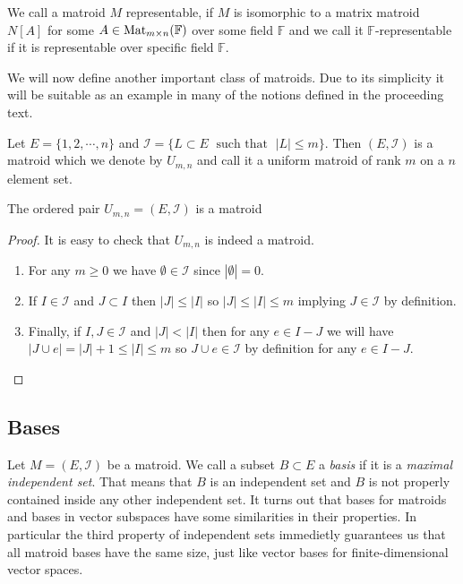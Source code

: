 \begin{defn}
    We call a matroid $M$ representable, if $M$ is isomorphic to a matrix matroid $N[A]$ for some $A \in \text{Mat}_{m \times n}(\mathbb{F})$ over some field $\mathbb{F}$ and we call it $\mathbb{F}$-representable if it is representable over specific field $\mathbb{F}$.
\end{defn}

We will now define another important class of matroids. Due to its simplicity it will be suitable as an example in many of the notions defined in the proceeding text.

\begin{defn}
    Let $E = \{1, 2, \cdots, n\}$ and $\mathcal{I} = \{ L \subset E \; \text{ such that } \; |L| \leq m\}$. Then $(E, \mathcal{I})$ is a matroid which we denote by $U_{m,n}$ and call it a uniform matroid of rank $m$ on a $n$ element set.
\end{defn}
\begin{theorem}
    The ordered pair $U_{m,n} = (E, \mathcal{I})$ is a matroid
    
\end{theorem}

\begin{proof}
    
It is easy to check that $U_{m,n}$ is indeed a matroid. 


\begin{enumerate}
   

\item For any $m \geq 0$ we have $\emptyset \in \mathcal{I}$ since $|\emptyset | = 0$.

\item If $I \in \mathcal{I}$ and $J \subset I$ then $|J|\leq |I|$ so $|J|\leq |I| \leq m$ implying $J \in \mathcal{I}$ by definition.

\item  Finally, if $I, J \in \mathcal{I}$ and $|J|<|I|$ then for any $e \in I - J$ we will have $|J \cup e| = |J| + 1 \leq |I| \leq m$ so $J \cup e \in \mathcal{I}$ by definition for any $e \in I - J.$


\end{enumerate}
\end{proof}

\subsection{Bases}

Let $M = (E, \mathcal{I})$ be a matroid. We call a subset $B \subset E$ a \textit{basis} if it is a \textit{maximal independent set}. That means that $B$ is an independent set and $B$ is not properly contained inside any other independent set. It turns out that bases for matroids and bases in vector subspaces have some similarities in their properties. In particular the third property of independent sets immedietly guarantees us that all matroid bases have the same size, just like vector bases for finite-dimensional vector spaces.

